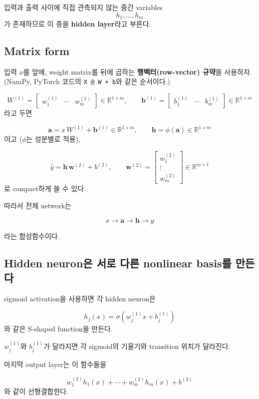\documentclass[11pt,a4paper]{article}
\newcommand{\R}{\mathbb{R}}
\newcommand{\vect}[1]{\bm{#1}}
\newcommand{\sigmoid}{\sigma}
\begin{document}
입력과 출력 사이에 직접 관측되지 않는 중간 variables
\[
h_1,\ldots,h_m
\]
가 존재하므로 이 층을 \textbf{hidden layer}라고 부른다.

\subsection{Matrix form}

입력 $x$를 앞에, weight matrix를 뒤에 곱하는 \textbf{행벡터(row-vector) 규약}을 사용하자.
(NumPy, PyTorch 코드의 \texttt{X @ W + b}와 같은 순서이다.)

\[
W^{(1)}
=
\begin{bmatrix}
w_1^{(1)} & \cdots & w_m^{(1)}
\end{bmatrix}
\in\R^{1\times m},
\qquad
\vect{b}^{(1)}
=
\begin{bmatrix}
b_1^{(1)} & \cdots & b_m^{(1)}
\end{bmatrix}
\in\R^{1\times m}
\]
라고 두면

\[
\vect{a}
=
x\,W^{(1)}+\vect{b}^{(1)}
\in\R^{1\times m},
\qquad
\vect{h}
=
\phi(\vect{a})
\in\R^{1\times m}
\]
이고 ($\phi$는 성분별로 적용),

\[
\widehat y
=
\vect{h}\,\vect{w}^{(2)}+b^{(2)},
\qquad
\vect{w}^{(2)}
=
\begin{bmatrix}
w_1^{(2)}\\
\vdots\\
w_m^{(2)}
\end{bmatrix}
\in\R^{m\times1}
\]
로 compact하게 쓸 수 있다.

따라서 전체 network는

\[
\boxed{
x
\longrightarrow
\vect{a}
\longrightarrow
\vect{h}
\longrightarrow
\widehat y
}
\]

라는 합성함수이다.

\subsection{Hidden neuron은 서로 다른 nonlinear basis를 만든다}

sigmoid activation을 사용하면 각 hidden neuron은

\[
h_j(x)
=
\sigmoid\!\left(w_j^{(1)}x+b_j^{(1)}\right)
\]
와 같은 S-shaped function을 만든다.

$w_j^{(1)}$와 $b_j^{(1)}$가 달라지면
각 sigmoid의 기울기와 transition 위치가 달라진다.

마지막 output layer는 이 함수들을

\[
w_1^{(2)}h_1(x)
+\cdots+
w_m^{(2)}h_m(x)
+b^{(2)}
\]
와 같이 선형결합한다.
\end{document}
